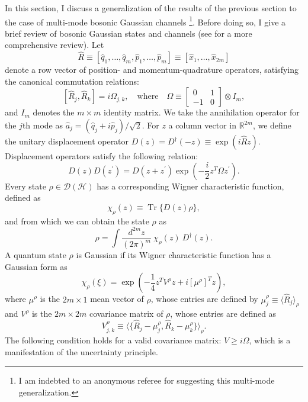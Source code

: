 \documentclass[apsrev,twocolumn]{revtex4-1}%
\begin{document}
In this section, I discuss a generalization of the results of the previous
section to the case of multi-mode bosonic Gaussian channels \footnote{I am
indebted to an anonymous referee for suggesting this multi-mode
generalization.}. Before doing so, I give a brief review of bosonic Gaussian
states and channels (see \cite{CEGH08} for a more comprehensive review). Let%
\begin{equation}
\hat{R}\equiv\left[  \hat{q}_{1},\ldots,\hat{q}_{m},\hat{p}_{1},\ldots,\hat
{p}_{m}\right]  \equiv\left[  \hat{x}_{1},\ldots,\hat{x}_{2m}\right]
\end{equation}
denote a row vector of position- and momentum-quadrature operators, satisfying
the canonical commutation relations:%
\begin{equation}
\left[  \hat{R}_{j},\hat{R}_{k}\right]  =i\Omega_{j,k},\quad\text{where}%
\quad\Omega\equiv%
\begin{bmatrix}
0 & 1\\
-1 & 0
\end{bmatrix}
\otimes I_{m},
\end{equation}
and $I_{m}$ denotes the $m\times m$ identity matrix. We take the annihilation
operator for the $j$th mode as $\hat{a}_{j}=(\hat{q}_{j}+i\hat{p}_{j}%
)/\sqrt{2}$. For $z$ a column vector in $\mathbb{R}^{2m}$, we define the
unitary displacement operator $D(z)=D^{\dagger}(-z)\equiv\exp(i\hat{R}z)$.
Displacement operators satisfy the following relation:%
\begin{equation}
D(z)D(z^{\prime})=D(z+z^{\prime})\exp\!\left(  -\frac{i}{2}z^{T}\Omega
z^{\prime}\right)  .
\end{equation}
Every state $\rho\in\mathcal{D}(\mathcal{H})$ has a corresponding Wigner
characteristic function, defined as%
\begin{equation}
\chi_{\rho}(z)\equiv\operatorname{Tr}\{D(z)\rho\},
\end{equation}
and from which we can obtain the state $\rho$ as%
\begin{equation}
\rho=\int\frac{d^{2m}z}{\left(  2\pi\right)  ^{m}}\ \chi_{\rho}(z)\ D^{\dag
}(z).
\end{equation}
A quantum state $\rho$ is Gaussian if its Wigner characteristic function has a
Gaussian form as%
\begin{equation}
\chi_{\rho}(\xi)=\exp\left(  -\frac{1}{4}z^{T}V^{\rho}z+i\left[  \mu^{\rho
}\right]  ^{T}z\right)  ,
\end{equation}
where $\mu^{\rho}$ is the $2m\times1$ mean vector of $\rho$, whose entries are
defined by $\mu_{j}^{\rho}\equiv\langle\hat{R}_{j}\rangle_{\rho}$ and
$V^{\rho}$ is the $2m\times2m$ covariance matrix of $\rho$, whose entries are
defined as%
\begin{equation}
V_{j,k}^{\rho}\equiv\langle\{\hat{R}_{j}-\mu_{j}^{\rho},\hat{R}_{k}-\mu
_{k}^{\rho}\}\rangle_{\rho}.
\end{equation}
The following condition holds for a valid covariance matrix: $V\geq i\Omega$,
which is a manifestation of the uncertainty principle.
\end{document}
